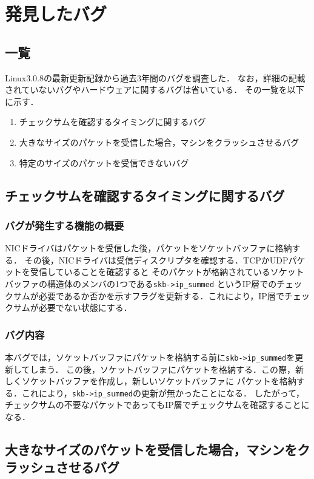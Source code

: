 \documentclass[12pt]{jsarticle}
\begin{document}
\section{発見したバグ}
\subsection{一覧}
Linux3.0.8の最新更新記録から過去3年間のバグを調査した．
なお，詳細の記載されていないバグやハードウェアに関するバグは省いている．
その一覧を以下に示す．
\begin{enumerate}
    \item チェックサムを確認するタイミングに関するバグ
    \item 大きなサイズのパケットを受信した場合，マシンをクラッシュさせるバグ
    \item 特定のサイズのパケットを受信できないバグ
\end{enumerate}

\subsection{チェックサムを確認するタイミングに関するバグ}
\subsubsection{バグが発生する機能の概要}
NICドライバはパケットを受信した後，パケットをソケットバッファに格納する．
その後，NICドライバは受信ディスクリプタを確認する．TCPかUDPパケットを受信していることを確認すると
そのパケットが格納されているソケットバッファの構造体のメンバの1つである{\tt skb->ip\_summed}
というIP層でのチェックサムが必要であるか否かを示すフラグを更新する．これにより，IP層でチェックサムが必要でない状態にする．

\subsubsection{バグ内容}
本バグでは，ソケットバッファにパケットを格納する前に{\tt skb->ip\_summed}を更新してしまう．
この後，ソケットバッファにパケットを格納する．この際，新しくソケットバッファを作成し，新しいソケットバッファに
パケットを格納する．これにより，{\tt skb->ip\_summed}の更新が無かったことになる．
したがって，チェックサムの不要なパケットであってもIP層でチェックサムを確認することになる．

\subsection{大きなサイズのパケットを受信した場合，マシンをクラッシュさせるバグ}
\end{document}
